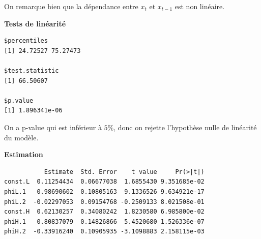 \documentclass[
  french,
]{article}
\newenvironment{Shaded}{\begin{snugshade}}{\end{snugshade}}
\newcommand{\AttributeTok}[1]{\textcolor[rgb]{0.77,0.63,0.00}{#1}}
\newcommand{\DecValTok}[1]{\textcolor[rgb]{0.00,0.00,0.81}{#1}}
\newcommand{\FunctionTok}[1]{\textcolor[rgb]{0.00,0.00,0.00}{#1}}
\newcommand{\NormalTok}[1]{#1}
\newcommand{\OtherTok}[1]{\textcolor[rgb]{0.56,0.35,0.01}{#1}}
\newcommand{\SpecialCharTok}[1]{\textcolor[rgb]{0.00,0.00,0.00}{#1}}
\begin{document}
On remarque bien que la dépendance entre \(x_t\) et \(x_{t-1}\) est non
linéaire.

\textbf{Tests de linéarité}

\begin{Shaded}
\end{Shaded}

\begin{verbatim}
$percentiles
[1] 24.72527 75.27473

$test.statistic
[1] 66.50607

$p.value
[1] 1.896341e-06
\end{verbatim}

On a p-value qui est inférieur à \(5\%\), donc on rejette l'hypothèse
nulle de linéarité du modèle.

\textbf{Estimation}

\begin{Shaded}
\end{Shaded}

\begin{verbatim}
           Estimate  Std. Error    t value     Pr(>|t|)
const.L  0.11254434  0.06677038  1.6855430 9.351685e-02
phiL.1   0.98690602  0.10805163  9.1336526 9.634921e-17
phiL.2  -0.02297053  0.09154768 -0.2509133 8.021508e-01
const.H  0.62130257  0.34080242  1.8230580 6.985800e-02
phiH.1   0.80837079  0.14826866  5.4520680 1.526336e-07
phiH.2  -0.33916240  0.10905935 -3.1098883 2.158115e-03
\end{verbatim}

\begin{Shaded}
\end{Shaded}
\end{document}
